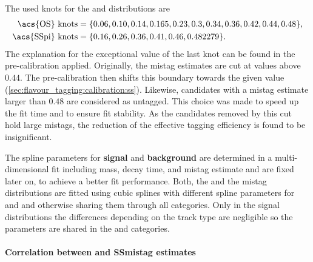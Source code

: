 The used knots for the \obsEtaOS and \obsEtaSS distributions are
%
\begin{equation*}
\begin{split}
  \text{\acs{OS} knots} &= \{0.06, 0.10, 0.14, 0.165, 0.23, 0.3, 0.34, 0.36, 0.42, 0.44, 0.48\} , \\
  \text{\acs{SSpi} knots} &= \{0.16, 0.26, 0.36, 0.41, 0.46, 0.482279\} .
\end{split}
\end{equation*}
%
The explanation for the exceptional value of the last \SSpi knot can be found in
the pre-calibration applied. Originally, the \SSpi mistag estimates are cut at
values above $\num{0.44}$. The pre-calibration then shifts this boundary towards
the given value (\cref{sec:flavour_tagging:calibration:ss}). Likewise,
\OS candidates with a mistag estimate larger than $\num{0.48}$ are considered as
\OS untagged. This choice was made to speed up the fit time and to ensure fit
stability. As the candidates removed by this cut hold large mistags, the
reduction of the effective tagging efficiency is found to be insignificant.

The spline parameters for \textbf{signal} and \textbf{background} are determined
in a multi-dimensional fit including mass, decay time, and mistag estimate and
are fixed later on, to achieve a better fit performance. Both, the \OS and the
\SSpi mistag distributions are fitted using cubic splines with different spline
parameters for \catDD and \catLL and otherwise sharing them through all
categories. Only in the signal \OS distributions the differences depending on
the track type are negligible so the parameters are shared in the \catDD and
\catLL categories.

\paragraph{Correlation between \OS and SS\pionbfsf mistag estimates}

